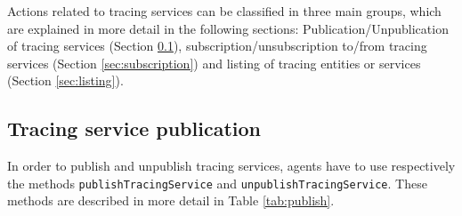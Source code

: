 	Actions related to tracing services can be classified in three main groups, which are explained in
	more detail in the following sections: Publication/Unpublication of tracing services (Section
	\ref{sec:publish}), subscription/unsubscription to/from tracing services (Section
	\ref{sec:subscription}) and listing of tracing entities or services (Section \ref{sec:listing}).

%
%
%
%
%
%
%

		\subsection{Tracing service publication}\label{sec:publish}

			In order to publish and unpublish tracing services, agents have to use respectively the
			methods \lstinline{publishTracingService} and \lstinline{unpublishTracingService}. These
			methods are described in more detail in Table \ref{tab:publish}.

